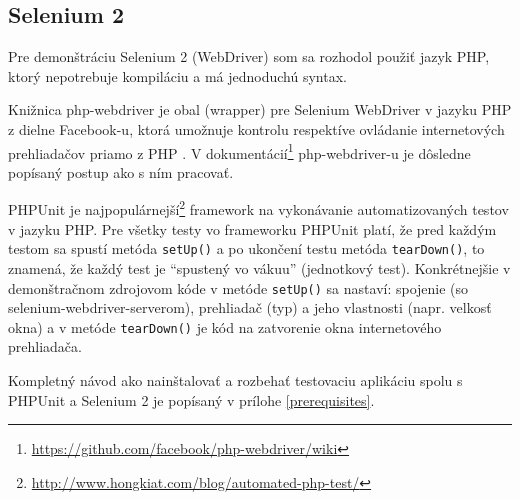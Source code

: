\subsection{Selenium 2}
Pre demonštráciu Selenium 2 (WebDriver) som sa rozhodol použiť jazyk PHP, ktorý nepotrebuje kompiláciu a má jednoduchú syntax.

Knižnica php-webdriver je obal (wrapper) pre Selenium WebDriver v jazyku PHP z dielne Facebook-u, ktorá umožnuje kontrolu respektíve ovládanie internetových prehliadačov priamo z PHP \cite{php-webdriver-facebook}. V dokumentácií\footnote{\url{https://github.com/facebook/php-webdriver/wiki}} php-webdriver-u je dôsledne popísaný postup ako s ním pracovať.

PHPUnit je najpopulárnejší\footnote{\url{http://www.hongkiat.com/blog/automated-php-test/}} framework na vykonávanie automatizovaných testov v jazyku PHP. Pre všetky testy vo frameworku PHPUnit platí, že pred každým testom sa spustí metóda \texttt{setUp()} a po ukončení testu metóda \texttt{tearDown()}, to znamená, že každý test je ``spustený vo vákuu'' (jednotkový test).
Konkrétnejšie v demonštračnom zdrojovom kóde v metóde \texttt{setUp()} sa nastaví: spojenie (so selenium-webdriver-serverom), prehliadač (typ) a jeho vlastnosti (napr. velkosť okna) a v metóde \texttt{tearDown()} je kód na zatvorenie okna internetového prehliadača.

Kompletný návod ako nainštalovať a rozbehať testovaciu aplikáciu spolu s PHPUnit a Selenium 2 je popísaný v prílohe \ref{prerequisites}.

